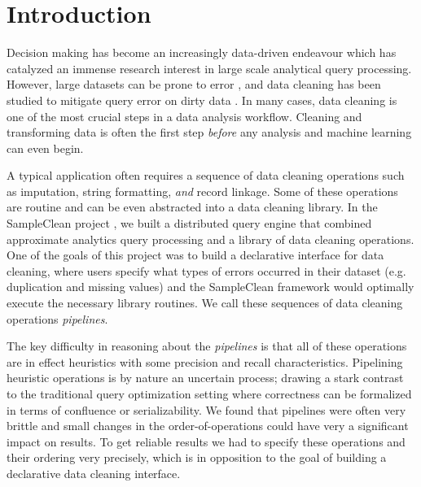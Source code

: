 \section{Introduction}
Decision making has become an increasingly data-driven endeavour which has catalyzed an immense research interest in large scale analytical query processing.
However, large datasets can be prone to error \cite{Gartner}, and data cleaning has been studied to mitigate query error on dirty data \cite{dasu2003exploratory, mayfield2010eracer, openrefine, wrangler, DBLP:conf/sigmod/DallachiesaEEEIOT13, DBLP:conf/pervasive/JefferyAFHW06}.
In many cases, data cleaning is one of the most crucial steps in a data analysis workflow.
Cleaning and transforming data is often the first step \emph{before} any analysis and machine learning can even begin.

A typical application often requires a sequence of data cleaning operations 
such as imputation, string formatting, \emph{and} record linkage.
Some of these operations are routine and can be even abstracted into a data cleaning library.
In the SampleClean project \cite{wang1999sample}, we built a distributed query engine that combined approximate analytics query processing 
and a library of data cleaning operations.
One of the goals of this project was to build a declarative interface for data cleaning, where users specify what types of errors
occurred in their dataset (e.g. duplication and missing values) and the SampleClean framework would optimally execute the necessary library routines.
We call these sequences of data cleaning operations \emph{pipelines}.

The key difficulty in reasoning about the \emph{pipelines} is that all of these operations are in effect heuristics with some precision and recall characteristics.
Pipelining heuristic operations is by nature an uncertain process; drawing a stark contrast to the traditional query optimization setting where correctness can be formalized in terms of confluence or serializability. 
We found that pipelines were often very brittle and small changes in the order-of-operations could have very a significant impact on results.
To get reliable results we had to specify these operations and their ordering very precisely, which is in opposition to the goal of building a declarative data cleaning interface.

